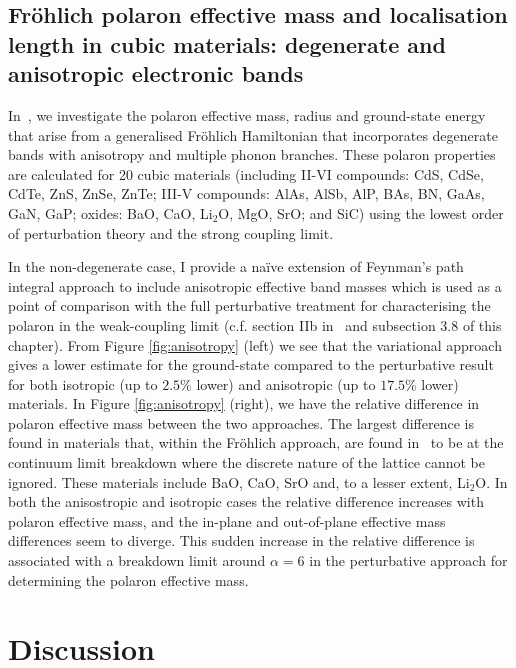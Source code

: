 \subsection{Fr\"ohlich polaron effective mass and localisation length in cubic materials:  degenerate and anisotropic electronic bands}

In~\cite{guster_frohlich_2021}, we investigate the polaron effective mass, radius and ground-state energy that arise from a generalised Fr\"ohlich Hamiltonian that incorporates degenerate bands with anisotropy and multiple phonon branches. These polaron properties are calculated for 20 cubic materials (including II-VI compounds: CdS, CdSe, CdTe, ZnS, ZnSe, ZnTe; III-V compounds: AlAs, AlSb, AlP, BAs, BN, GaAs, GaN, GaP; oxides: BaO, CaO, Li$_2$O, MgO, SrO; and SiC) using the lowest order of perturbation theory and the strong coupling limit. \newline

\noindent In the non-degenerate case, I provide a na\"ive extension of Feynman's path integral approach to include anisotropic effective band masses which is used as a point of comparison with the full perturbative treatment for characterising the polaron in the weak-coupling limit (c.f. section IIb in~\cite{guster_frohlich_2021} and subsection 3.8 of this chapter). From Figure \ref{fig:anisotropy} (left) we see that the variational approach gives a lower estimate for the ground-state compared to the perturbative result for both isotropic (up to $2.5$\% lower) and anisotropic (up to $17.5$\% lower) materials. In Figure \ref{fig:anisotropy} (right), we have the relative difference in polaron effective mass between the two approaches. The largest difference is found in materials that, within the Fr\"ohlich approach, are found in~\cite{guster_frohlich_2021} to be at the continuum limit breakdown where the discrete nature of the lattice cannot be ignored. These materials include BaO, CaO, SrO and, to a lesser extent, Li$_2$O. In both the anisostropic and isotropic cases the relative difference increases with polaron effective mass, and the in-plane and out-of-plane effective mass differences seem to diverge. This sudden increase in the relative difference is associated with a breakdown limit around $\alpha = 6$ in the perturbative approach for determining the polaron effective mass.

\section{Discussion}

